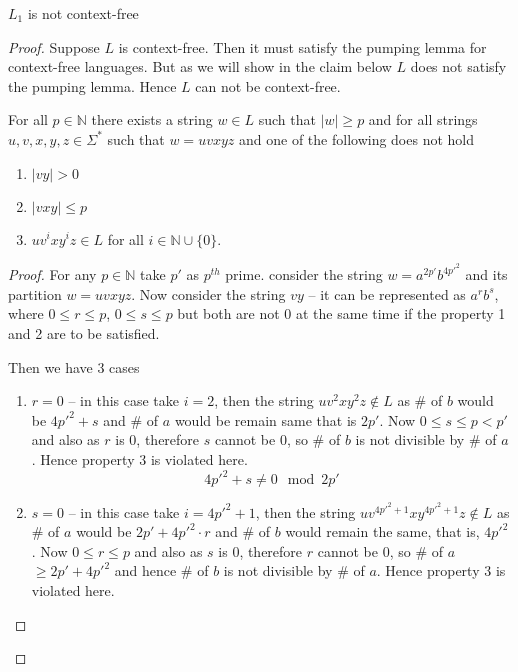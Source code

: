 
\begin{soln}
\begin{claim}
$L_1$ is not context-free
\end{claim}
\begin{proof}
Suppose $L$ is context-free. Then it must satisfy the pumping lemma for context-free languages.
But as we will show in the claim below $L$ does not satisfy the pumping lemma. Hence $L$ can
not be context-free.\nl
\begin{claim}
For all $p \in \mathbb{N}$ there exists a string $w \in L$ such that $|w| \geq p$ and
for all strings $u, v, x, y, z \in \Sigma^*$ such that $w = uvxyz$  and one of the following does 
not hold
\begin{enumerate}
    \item  $|vy| > 0$
    \item $|vxy| \leq p$
    \item  $uv^ixy^iz \in L$ for all $i \in \mathbb{N} \cup \{0\}$.
\end{enumerate}
\end{claim}
\begin{proof}
For any $p \in \mathbb{N}$ take $p'$ as $p^{th}$ prime. consider the string $w = a^{2p'} b^{4{p'}^2}$ and its partition $w = uvxyz$.
Now consider the string $vy$ -- it can be represented as $a^rb^s$, where $0\leq r \leq p$, $0 \leq s \leq p$ but both are not 0 at the same time if the property 1 and 2 are to be satisfied.

Then we have 3 cases
\begin{enumerate}
    \item $r=0$ -- in this case take $i=2$, then the string  $uv^2xy^2z \notin L$ as \# of $b$ would be $4{p'}^2+s$ and \# of $a$ would be remain same that is $2p'$. Now $0 \leq s \leq p < p'$ and also as $r$ is $0$, therefore $s$ cannot be $0$, so \# of $b$ is not divisible by \# of $a$.
    Hence property $3$ is violated here.
    \[
    4p'^2 + s \neq 0 \mod 2p'
    \]
    
    \item $s=0$ -- in this case take $i = 4{p'}^2+1$, then the string  $uv^{4{p'}^2+1}xy^{4{p'}^2+1}z \notin L$ as \# of $a$ would be $2p'+4{p'}^2 \cdot r$ and \# of $b$ would remain the same, that is, $4{p'}^2$. Now $0 \leq r \leq p$ and also as $s$ is $0$, therefore $r$ cannot be $0$, so \# of $a$ $\geq 2p'+4{p'}^2$ and hence \# of $b$ is not divisible by \# of $a$.
    Hence property $3$ is violated here.
     

\end{enumerate}
\end{proof}
\end{proof}
\end{soln}
